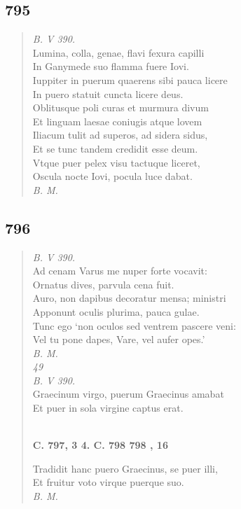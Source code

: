 \documentclass[11pt, a4paper]{report}
\begin{document}
            \subsection*{795}
      \begin{verse}
      \textit{B. V 390.} \\ Lumina, colla, genae, flavi fexura capilli \\ In Ganymede suo flamma fuere Iovi. \\ Iuppiter in puerum quaerens sibi pauca licere \\ In puero statuit cuncta licere deus. \\ Oblitusque poli curas et murmura divum \\ Et linguam laesae coniugis atque lovem \\ Iliacum tulit ad superos, ad sidera sidus, \\ Et se tunc tandem credidit esse deum. \\ Vtque puer pelex visu tactuque liceret, \\ Oscula nocte Iovi, pocula luce dabat. \\ \textit{B. M.} \\ 
      \end{verse}
  
            \subsection*{796}
      \begin{verse}
      \textit{B. V 390.} \\ Ad cenam Varus me nuper forte vocavit: \\ Ornatus dives, parvula cena fuit. \\ Auro, non dapibus decoratur mensa; ministri \\ Apponunt oculis plurima, pauca gulae. \\ Tunc ego ‘non oculos sed ventrem pascere veni: \\ Vel tu pone dapes, Vare, vel aufer opes.’ \\ \textit{B. M.} \\ \textit{49} \\ \textit{B. V 390.} \\ Graecinum virgo, puerum Graecinus amabat \\ Et puer in sola virgine captus erat. \\ 
        ﻿\pagebreak 
    \begin{center} \textbf{C. 797, 3 4. C. 798 798 , 16} \end{center} \marginpar{[074]} Tradidit hanc puero Graecinus, se puer illi, \\ Et fruitur voto virque puerque suo. \\ \textit{B. M.} \\ 
      \end{verse}
  
\end{document}
